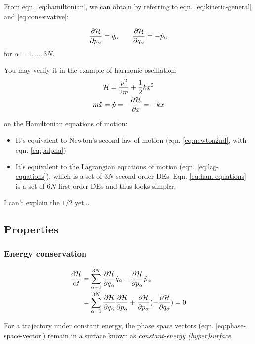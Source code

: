 From eqn. \ref{eq:hamiltonian}, we can obtain by referring to eqn. \ref{eq:kinetic-general} and \ref{eq:conservative}:
\begin{tcolorbox}[title={Hamiltonian's equations of motion}]
	\begin{gather}
		\dfrac{\partial \mathcal{H}}{\partial p_\alpha}=\dot{q}_\alpha \qquad \dfrac{\partial \mathcal{H}}{\partial q_\alpha}=-\dot{p}_\alpha
		\label{eq:ham-equations}
	\end{gather}
	for $\alpha=1,\dots,3N$. 
\end{tcolorbox}

\example You may verify it in the example of harmonic oscillation:
\begin{gather*}
	\mathcal{H}=\dfrac{p^2}{2m}+\dfrac{1}{2} kx^2\\
	m\ddot{x}=\dot{p}=-\dfrac{\partial \mathcal{H}}{\partial x}=-kx
\end{gather*}

\mynote on the Hamiltonian equations of motion:
\begin{itemize}
	\item It's equivalent to Newton's second law of motion (eqn. \ref{eq:newton2nd}, with eqn. \ref{eq:palpha})
	\item It's equivalent to the Lagrangian equations of motion (eqn. \ref{eq:lag-equations}), which is a set of $3N$ second-order DEs. Eqn. \ref{eq:ham-equations} is a set of $6N$ first-order DEs and thus looks simpler.
\end{itemize}

\supplement I can't explain the $1/2$ yet...

\subsection{Properties}

\vspace{0.5em}
\subsubsection{Energy conservation}
\vspace{-1.2em}
\begin{align*}
	\dfrac{\mathrm{d} \mathcal{H}}{\mathrm{d} t}&=\sum_{\alpha=1}^{3N} \dfrac{\partial \mathcal{H}}{\partial q_\alpha}\dot{q}_\alpha+\dfrac{\partial \mathcal{H}}{\partial p_\alpha}\dot{p}_\alpha\\
	&=\sum_{\alpha=1}^{3N}\dfrac{\partial \mathcal{H}}{\partial q_\alpha}\dfrac{\partial \mathcal{H}}{\partial p_\alpha}+\dfrac{\partial \mathcal{H}}{\partial p_\alpha}(-\dfrac{\partial \mathcal{H}}{\partial q_\alpha})=0
\end{align*}

For a trajectory under constant energy, the phase space vectors (eqn. \ref{eq:phase-space-vector}) remain in a surface known as \textit{constant-energy (hyper)surface}.

